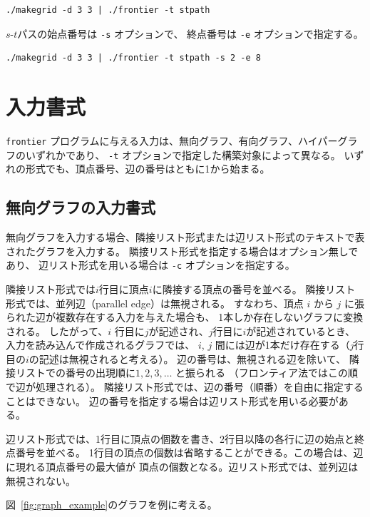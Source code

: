 \documentclass{jsarticle}
\begin{document}
\begin{verbatim}
./makegrid -d 3 3 | ./frontier -t stpath
\end{verbatim}

$s$-$t$パスの始点番号は \texttt{-s} オプションで、
終点番号は \texttt{-e} オプションで指定する。

\begin{verbatim}
./makegrid -d 3 3 | ./frontier -t stpath -s 2 -e 8
\end{verbatim}


\section{入力書式}

\texttt{frontier} プログラムに与える入力は、無向グラフ、有向グラフ、ハイパーグラフのいずれかであり、
\texttt{-t} オプションで指定した構築対象によって異なる。
いずれの形式でも、頂点番号、辺の番号はともに1から始まる。

\subsection{無向グラフの入力書式}

無向グラフを入力する場合、隣接リスト形式または辺リスト形式のテキストで表されたグラフを入力する。
隣接リスト形式を指定する場合はオプション無しであり、
辺リスト形式を用いる場合は \texttt{-c} オプションを指定する。

隣接リスト形式では$i$行目に頂点$i$に隣接する頂点の番号を並べる。
隣接リスト形式では、並列辺（parallel edge）は無視される。
すなわち、頂点 $i$ から $j$ に張られた辺が複数存在する入力を与えた場合も、
1本しか存在しないグラフに変換される。
したがって、$i$ 行目に$j$が記述され、$j$行目に$i$が記述されているとき、
入力を読み込んで作成されるグラフでは、
$i$, $j$ 間には辺が1本だけ存在する（$j$行目の$i$の記述は無視されると考える）。
辺の番号は、無視される辺を除いて、
隣接リストでの番号の出現順に$1,2,3,\ldots$ と振られる
（フロンティア法ではこの順で辺が処理される）。
隣接リスト形式では、辺の番号（順番）を自由に指定することはできない。
辺の番号を指定する場合は辺リスト形式を用いる必要がある。

辺リスト形式では、1行目に頂点の個数を書き、2行目以降の各行に辺の始点と終点番号を並べる。
1行目の頂点の個数は省略することができる。この場合は、辺に現れる頂点番号の最大値が
頂点の個数となる。辺リスト形式では、並列辺は無視されない。

図~\ref{fig:graph_example}のグラフを例に考える。
\end{document}
